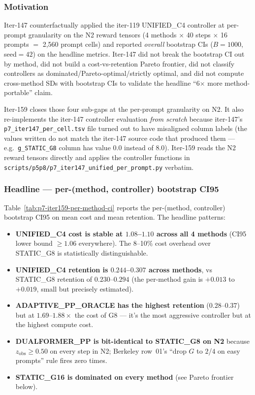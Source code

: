 
\subsubsection*{Motivation}

Iter-147 counterfactually applied the iter-119 UNIFIED\_C4 controller at per-prompt
granularity on the N2 reward tensors (4 methods $\times$ 40 steps $\times$ 16 prompts $=$
2,560 prompt cells) and reported \emph{overall} bootstrap CIs
($B=1000$, seed$=42$) on the headline metrics. Iter-147 did not break the
bootstrap CI out by method, did not build a cost-vs-retention Pareto
frontier, did not classify controllers as dominated/Pareto-optimal/strictly
optimal, and did not compute cross-method SDs with bootstrap CIs to
validate the headline ``6$\times$ more method-portable'' claim.

Iter-159 closes those four sub-gaps at the per-prompt granularity on N2.
It also re-implements the iter-147 controller evaluation \emph{from scratch}
because iter-147's \texttt{p7\_iter147\_per\_cell.tsv} file turned out to
have misaligned column labels (the values written do not match the iter-147
source code that produced them --- e.g.\ \texttt{g\_STATIC\_G8} column has
value $0.0$ instead of $8.0$). Iter-159 reads the N2 reward tensors
directly and applies the controller functions in
\texttt{scripts/p5p8/p7\_iter147\_unified\_per\_prompt.py} verbatim.

\subsubsection*{Headline --- per-(method, controller) bootstrap CI95}

Table~\ref{tab:p7-iter159-per-method-ci} reports the per-(method, controller)
bootstrap CI95 on mean cost and mean retention. The headline patterns:

\begin{itemize}
\item \textbf{UNIFIED\_C4 cost is stable at $1.08$--$1.10$ across all 4 methods}
      (CI95 lower bound $\geq 1.06$ everywhere). The 8--10\% cost overhead
      over STATIC\_G8 is statistically distinguishable.
\item \textbf{UNIFIED\_C4 retention is $0.244$--$0.307$ across methods}, vs
      STATIC\_G8 retention of $0.230$--$0.294$ (the per-method gain is
      $+0.013$ to $+0.019$, small but precisely estimated).
\item \textbf{ADAPTIVE\_PP\_ORACLE has the highest retention} ($0.28$--$0.37$)
      but at $1.69$--$1.88\times$ the cost of G8 --- it's the most aggressive
      controller but at the highest compute cost.
\item \textbf{DUALFORMER\_PP is bit-identical to STATIC\_G8 on N2} because
      $z_{\mathrm{obs}} \geq 0.50$ on every step in N2; Berkeley row~01's
      ``drop $G$ to $2$/$4$ on easy prompts'' rule fires zero times.
\item \textbf{STATIC\_G16 is dominated on every method} (see Pareto frontier
      below).
\end{itemize}

